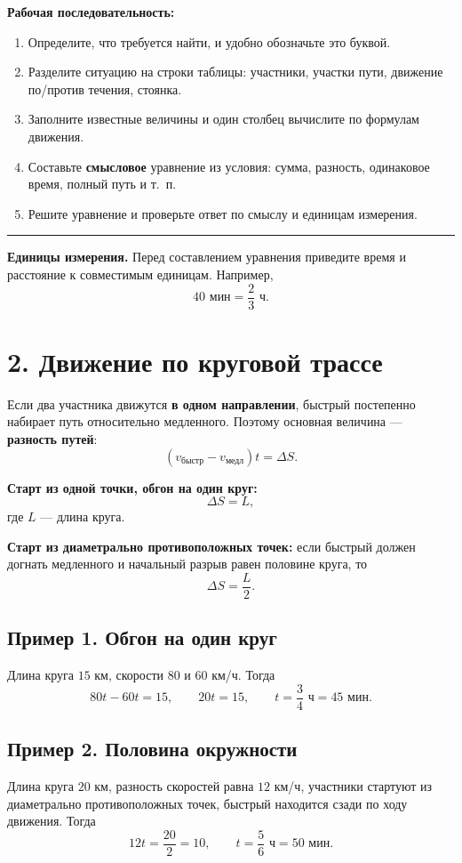 \documentclass[a4paper,12pt]{article}
\newcommand{\lessonrule}{\vspace{0.25em}\hrule\vspace{0.65em}}
\begin{document}
\textbf{Рабочая последовательность:}
\begin{enumerate}
  \item Определите, что требуется найти, и удобно обозначьте это буквой.
  \item Разделите ситуацию на строки таблицы: участники, участки пути, движение по/против течения, стоянка.
  \item Заполните известные величины и один столбец вычислите по формулам движения.
  \item Составьте \textbf{смысловое} уравнение из условия: сумма, разность, одинаковое время, полный путь и т.~п.
  \item Решите уравнение и проверьте ответ по смыслу и единицам измерения.
\end{enumerate}

\lessonrule
\textbf{Единицы измерения.} Перед составлением уравнения приведите время и расстояние к совместимым единицам. Например,
\[
40\text{ мин}=\frac{2}{3}\text{ ч}.
\]

\section*{2. Движение по круговой трассе}

Если два участника движутся \textbf{в одном направлении}, быстрый постепенно набирает путь относительно медленного. Поэтому основная величина — \textbf{разность путей}:
\[
(v_{\text{быстр}}-v_{\text{медл}})t=\Delta S.
\]

\textbf{Старт из одной точки, обгон на один круг:}
\[
\Delta S=L,
\]
где \(L\) — длина круга.

\textbf{Старт из диаметрально противоположных точек:}
если быстрый должен догнать медленного и начальный разрыв равен половине круга, то
\[
\Delta S=\frac{L}{2}.
\]

\subsection*{Пример 1. Обгон на один круг}
Длина круга \(15\) км, скорости \(80\) и \(60\) км/ч. Тогда
\[
80t-60t=15,
\qquad 20t=15,
\qquad t=\frac34\text{ ч}=45\text{ мин}.
\]

\subsection*{Пример 2. Половина окружности}
Длина круга \(20\) км, разность скоростей равна \(12\) км/ч, участники стартуют из диаметрально противоположных точек, быстрый находится сзади по ходу движения. Тогда
\[
12t=\frac{20}{2}=10,
\qquad t=\frac56\text{ ч}=50\text{ мин}.
\]
\end{document}
